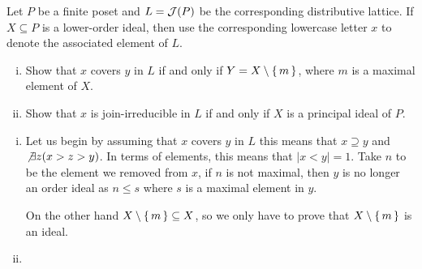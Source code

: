 \documentclass[12pt]{memoir}
\begin{document}
\begin{Ej}
    Let $P$ be a finite poset and $L=\mathcal{J}(P)$ be the corresponding distributive lattice. If $X\subseteq P$ is a lower-order ideal, then use the corresponding lowercase letter $x$ to denote the associated element of $L$. 
    \begin{enumerate}[i)]
        \itemsep=-0.4em
        \item Show that $x$ covers $y$ in $L$ if and only if $Y=X\setminus\{\,m\,\}$, where $m$ is a maximal element of $X$.
        \item Show that $x$ is join-irreducible in $L$ if and only if $X$ is a principal ideal of $P$.
    \end{enumerate}
 \end{Ej}
\iffalse
 We will use the following lemma which is Proposition 5.1.2 in Sagan. 

 \begin{Lem}
If $P$ is finite and $I$ is an ideal, then $I=\gen(S)$ where $S$ is the set of maximal elements in $I$. 
 \end{Lem}

\begin{ptcbp}
If $x\in I$, consider $X\set{y\in I:\ y\geq x}$, the set of upper bounds of $x$. This set is non-empty as $x\geq x$ and there must exist a maximal element of $X$ since $P$ is finite. Call $s\in X$ such a maximal element. If $s$ is not maximal in $I$, then $\exists \tilde{s}\in I(\tilde{s}\geq s)$ and this means that $\tilde{s}\geq x$. This contradicts the maximality of $s$ in $X$.\par 
This proves that $x\in\gen(S)$ as $s$ is a maximal element of $I$.\par 
On the other hand if $x\in\gen(S)$ then, $x\leq s$ for some $s\in S\subseteq I$. As $I$ is an order ideal and $s\in I$, then $x\in I$. 
\end{ptcbp}
\fi
\begin{ptcbr}
    \begin{enumerate}[i)]
        \itemsep=-0.4em
        \item Let us begin by assuming that $x$ covers $y$ in $L$ this means that $x\supseteq y$ and $\not\exists z(x>z>y)$. In terms of elements, this means that $|x\less y|=1$. Take $n$ to be the element we removed from $x$, if $n$ is not maximal, then $y$ is no longer an order ideal as $n\leq s$ where $s$ is a maximal element in $y$.\par 
        On the other hand $X\setminus\{\,m\,\}\subseteq X$, so we only have to prove that $X\setminus\{\,m\,\}$ is an ideal. 
        \item 
    \end{enumerate}
\end{ptcbr}
\end{document}
